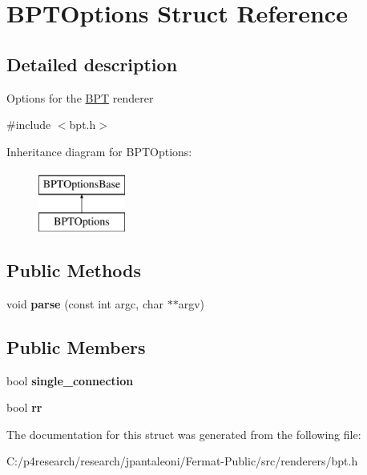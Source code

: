 \hypertarget{struct_b_p_t_options}{}\section{B\+P\+T\+Options Struct Reference}
\label{struct_b_p_t_options}


\subsection{Detailed description}
Options for the \hyperlink{struct_b_p_t}{B\+PT} renderer 

{\ttfamily \#include $<$bpt.\+h$>$}

Inheritance diagram for B\+P\+T\+Options\+:\begin{figure}[H]
\begin{center}
\leavevmode
\includegraphics[height=2.000000cm]{struct_b_p_t_options}
\end{center}
\end{figure}
\subsection*{Public Methods}
\begin{DoxyCompactItemize}
\item 
\mbox{\label{struct_b_p_t_options_aeb706710c32bd1c53bfca3a248ede3f5}} 
void {\bfseries parse} (const int argc, char $\ast$$\ast$argv)
\end{DoxyCompactItemize}
\subsection*{Public Members}
\begin{DoxyCompactItemize}
\item 
\mbox{\label{struct_b_p_t_options_ad54009c95340a34e6e847e5f8899883e}} 
bool {\bfseries single\+\_\+connection}
\item 
\mbox{\label{struct_b_p_t_options_ac6348f0a4046615f49adc8c2e0352582}} 
bool {\bfseries rr}
\end{DoxyCompactItemize}


The documentation for this struct was generated from the following file\+:\begin{DoxyCompactItemize}
\item 
C\+:/p4research/research/jpantaleoni/\+Fermat-\/\+Public/src/renderers/bpt.\+h\end{DoxyCompactItemize}
